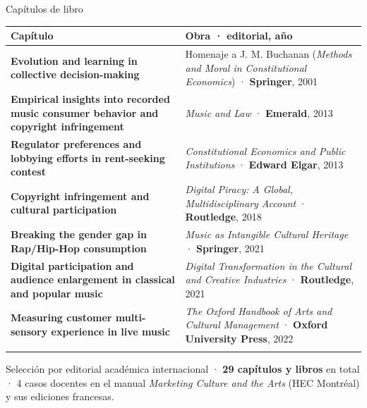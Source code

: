 \documentclass[
  8pt,
  ignorenonframetext,
  aspectratio=169,
  spanish,
]{beamer}
\newcommand{\lightrowrule}{\arrayrulecolor{black!25}\specialrule{0.4pt}{1pt}{1pt}\arrayrulecolor{black}}
\begin{document}
\begin{frame}[shrink]{Capítulos de libro}
\label{capuxedtulos-de-libro}
~

\begin{longtable}[]{@{}
  >{\raggedright\arraybackslash}p{}
  >{\raggedright\arraybackslash}p{}@{}}
\toprule\noalign{}
\begin{minipage}[b]{\linewidth}\raggedright
Capítulo
\end{minipage} & \begin{minipage}[b]{\linewidth}\raggedright
Obra · editorial, año
\end{minipage} \\
\midrule\noalign{}
\endhead
\bottomrule\noalign{}
\endlastfoot
\textbf{Evolution and learning in collective decision-making} & Homenaje
a J. M. Buchanan (\emph{Methods and Moral in Constitutional Economics})
· \textbf{Springer}, 2001 \\ \lightrowrule
\textbf{Empirical insights into recorded music consumer behavior and
copyright infringement} & \emph{Music and Law} · \textbf{Emerald},
2013 \\ \lightrowrule
\textbf{Regulator preferences and lobbying efforts in rent-seeking
contest} & \emph{Constitutional Economics and Public Institutions} ·
\textbf{Edward Elgar}, 2013 \\ \lightrowrule
\textbf{Copyright infringement and cultural participation} &
\emph{Digital Piracy: A Global, Multidisciplinary Account} ·
\textbf{Routledge}, 2018 \\ \lightrowrule
\textbf{Breaking the gender gap in Rap/Hip-Hop consumption} &
\emph{Music as Intangible Cultural Heritage} · \textbf{Springer},
2021 \\ \lightrowrule
\textbf{Digital participation and audience enlargement in classical and
popular music} & \emph{Digital Transformation in the Cultural and
Creative Industries} · \textbf{Routledge}, 2021 \\ \lightrowrule
\textbf{Measuring customer multi-sensory experience in live music} &
\emph{The Oxford Handbook of Arts and Cultural Management} ·
\textbf{Oxford University Press}, 2022 \\ \lightrowrule
\end{longtable}

Selección por editorial académica internacional · \textbf{29 capítulos y
libros} en total · 4 casos docentes en el manual \emph{Marketing Culture
and the Arts} (HEC Montréal) y sus ediciones francesas.

\end{frame}
\end{document}
